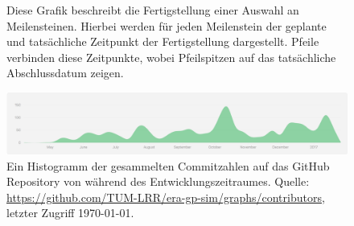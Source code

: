 \begin{figure}[t!]
  \centering
  \caption{Diese Grafik beschreibt die Fertigstellung einer Auswahl an Meilensteinen. Hierbei werden für jeden Meilenstein der geplante und tatsächliche Zeitpunkt der Fertigstellung dargestellt. Pfeile verbinden diese Zeitpunkte, wobei Pfeilspitzen auf das tatsächliche Abschlussdatum zeigen.}
  \label{fig:time-frame}
  \vspace{-0.2cm}
\end{figure}

\begin{figure}[H]
  \centering
  \includegraphics[scale=0.45]{figures/commit-history}
  \caption{Ein Histogramm der gesammelten Commitzahlen auf das GitHub Repository von \erasim{} während des Entwicklungszeitraumes. Quelle: {\small\url{https://github.com/TUM-LRR/era-gp-sim/graphs/contributors}}, letzter Zugriff \today.}
  \label{fig:commit-history}
\end{figure}

